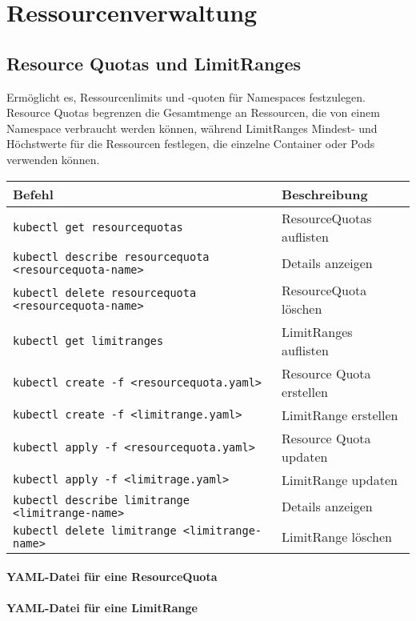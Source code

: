 \chapter{Ressourcenverwaltung}

\section{Resource Quotas und LimitRanges}
Ermöglicht es, Ressourcenlimits und -quoten für Namespaces festzulegen. Resource Quotas begrenzen die Gesamtmenge an Ressourcen, die von einem Namespace verbraucht werden können, während LimitRanges Mindest- und Höchstwerte für die Ressourcen festlegen, die einzelne Container oder Pods verwenden können.\\

\noindent
\begin{tabular}{
|p{}|p{}|}
\hline
\textbf{Befehl} & \textbf{Beschreibung} \\
\hline
\texttt{kubectl get resourcequotas} & ResourceQuotas auflisten \\
\texttt{kubectl describe resourcequota <resourcequota-name>} & Details anzeigen \\
\texttt{kubectl delete resourcequota <resourcequota-name>} & ResourceQuota löschen \\
\texttt{kubectl get limitranges} & LimitRanges auflisten \\
\texttt{kubectl create -f <resourcequota.yaml>} & Resource Quota erstellen\\
\texttt{kubectl create -f <limitrange.yaml>} & LimitRange erstellen\\
\texttt{kubectl apply -f <resourcequota.yaml>} & Resource Quota updaten\\
\texttt{kubectl apply -f <limitrage.yaml>} & LimitRange updaten\\
\texttt{kubectl describe limitrange <limitrange-name>} & Details anzeigen \\
\texttt{kubectl delete limitrange <limitrange-name>} & LimitRange löschen \\
\hline
\end{tabular}

\subsubsection{YAML-Datei für eine ResourceQuota}


\newpage
\subsubsection{YAML-Datei für eine LimitRange}


